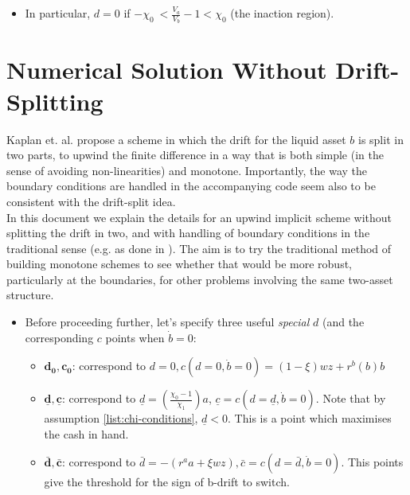 \documentclass[11pt]{article}
\begin{document}
\begin{itemize}
\item In particular, \(d=0\) if \(-\chi_{0}\ < \frac{V_{a}}{V_{b}}-1 < \chi_0\) (the inaction region).
\end{itemize}


\section{Numerical Solution Without Drift-Splitting}
\label{sec:orgd93c8f7}
Kaplan et. al. propose a scheme in which the drift for the liquid asset \(b\) is split in two parts, to upwind the finite difference in a way that is both simple (in the sense of avoiding non-linearities) and monotone. Importantly, the way the boundary conditions are handled in the accompanying code seem also to be consistent with the drift-split idea.\\[0pt]

In this document we explain the details for an upwind implicit scheme without splitting the drift in two, and with handling of boundary conditions in the traditional sense (e.g. as done in \cite{achdou2022income}). The aim is to try the traditional method of building monotone schemes to see whether that would be more robust, particularly at the boundaries, for other problems involving the same two-asset structure.

\begin{itemize}
\item Before proceeding further, let's specify three useful \emph{special} \(d\) (and the corresponding \(c\) points when \(\dot{b}=0\):
\begin{itemize}
\item \(\mathbf{d_0, c_0}\): correspond to \(d=0, c(d=0, \dot{b}=0) = (1-\xi)w z+r^{b}(b)b\)
\item \(\mathbf{\underline{d}, \underline{c}}\): correspond to \(\underline{d} = \left( \frac{\chi_0-1}{\chi_1} \right)a\), \(\underline{c} = c(d=\underline{d}, \dot{b}=0)\). Note that by assumption \ref{list:chi-conditions}, \(\underline{d} < 0\). This is a point which maximises the cash in hand.
\item \(\mathbf{\bar{d}, \bar{c}}\): correspond to \(\bar{d} = -(r^{a}a+\xi w z), \bar{c} = c \left( d=\bar{d}, \dot{b}=0 \right)\). This points give the threshold for the sign of b-drift to switch.
\end{itemize}
\end{itemize}
\end{document}

